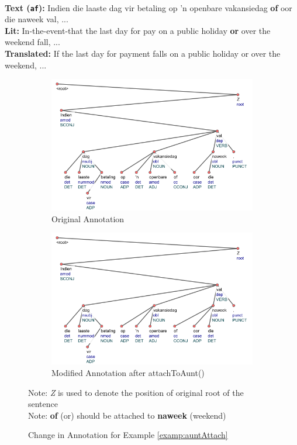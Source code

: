 \begin{example}
\label{examp:auntAttach}
\textbf{ }\\
\textbf{Text (\texttt{af}):} Indien die laaste dag vir betaling op 'n openbare vakansiedag \textbf{of} oor die naweek val, ... \\
\textbf{Lit:} In-the-event-that the last day for pay on a public holiday \textbf{or} over the weekend fall, ...\\
\textbf{Translated:} If the last day for payment falls on a public holiday or over the weekend, ...
\end{example}

\begin{figure}
    \centering
    \begin{subfigure}{\textwidth}
    \includegraphics[scale=0.80]{img/auntAttachOriginal.png}
    \caption{Original Annotation}
    \label{fig:auntAttach-1}
    \end{subfigure}
    \begin{subfigure}{\textwidth}
    \includegraphics[scale=0.80]{img/auntAttachFinal.png}
    \caption{Modified Annotation after attachToAunt()}
    \label{fig:auntAttach-2}
    \end{subfigure}
    \caption{Change in Annotation for Example \ref{examp:auntAttach}}
    Note: \textit{Z} is used to denote the position of original root of the sentence\\
    Note: \textbf{of} (or) should be attached to \textbf{naweek} (weekend)
    \label{fig:auntAttach}
\end{figure}

